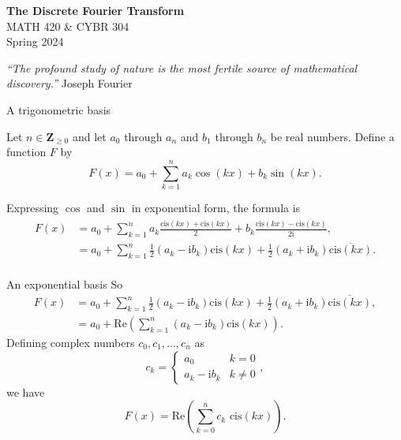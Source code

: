 \documentclass[portrait,fleqn,12pt]{beamer}
\newcommand{\integers}{\mathbf{Z}}
\newcommand{\cis}{\mathrm{cis}}
\newcommand{\imag}{\mathrm{i}}
\newcommand{\re}{\mathrm{Re}}
\begin{document}
\begin{frame}
\begin{flushleft} 
\textbf{The Discrete Fourier Transform} \\
MATH 420 \& CYBR 304 \\
Spring 2024 
\end{flushleft}

\emph{“The profound study of nature is the most fertile source of mathematical discovery.”} \hfill{\sc  Joseph Fourier}

\end{frame}


\begin{frame}{A trigonometric basis}  


Let $n \in \integers_{\geq 0}$ and let $a_0$ through $a_n$ and $b_1$ through $b_n$ be real numbers.  Define a function $F$ by 
\begin{equation*}
F(x) = a_0 + \sum_{k=1}^n a_k \cos(k x) +  b_k \sin(k x).
\end{equation*}

Expressing $\cos$ and $\sin$ in exponential form, the formula is 
\begin{align*}
F(x) &= a_0 + \sum_{k=1}^n a_k  \frac{\cis(k x) +  \overline{\cis(k x)}}{2} + b_k  \frac{\cis(k x) -  \overline{\cis(k x)}}{2 \imag}, \\
       & = a_0 + \sum_{k=1}^n \frac{1}{2} (a_k  - \imag b_k) \cis(k x) +   \frac{1}{2} (a_k  + \imag b_k) \overline{\cis(k x) } .  \\
\end{align*}
\end{frame}

\begin{frame}{An exponential basis}
So
\begin{align*}
F(x)   & = a_0 + \sum_{k=1}^n \frac{1}{2} (a_k  - \imag b_k) \cis(k x) +   \frac{1}{2} (a_k  + \imag b_k) \overline{\cis(k x) },   \\
          &= a_0 + \re  \left ( \sum_{k=1}^n (a_k  - \imag b_k) \cis(k x) \right).
\end{align*}
Defining complex numbers $c_0, c_1, \dots, c_n $ as
\begin{equation*}
  c_k = \begin{cases} a_0  & k =0 \\ a_k  - \imag b_k & k \neq 0 \end{cases},
\end{equation*}
we have
\begin{equation*}
F(x)    = \re  \left ( \sum_{k=0}^n c_k \,  \, \cis(k x) \right).
\end{equation*}
\end{frame}
\end{document}
